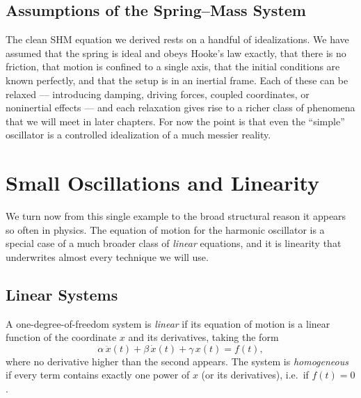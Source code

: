 \subsection{Assumptions of the Spring--Mass System}

The clean SHM equation we derived rests on a handful of idealizations. We have assumed that the spring is ideal and obeys Hooke's law exactly, that there is no friction, that motion is confined to a single axis, that the initial conditions are known perfectly, and that the setup is in an inertial frame. Each of these can be relaxed --- introducing damping, driving forces, coupled coordinates, or noninertial effects --- and each relaxation gives rise to a richer class of phenomena that we will meet in later chapters. For now the point is that even the ``simple'' oscillator is a controlled idealization of a much messier reality.

\section{Small Oscillations and Linearity}

We turn now from this single example to the broad structural reason it appears so often in physics. The equation of motion for the harmonic oscillator is a special case of a much broader class of \emph{linear} equations, and it is linearity that underwrites almost every technique we will use.

\subsection{Linear Systems}

\begin{definition}
A one-degree-of-freedom system is \emph{linear} if its equation of motion is a linear function of the coordinate $x$ and its derivatives, taking the form
\begin{equation}
    \alpha\,\ddot{x}(t) + \beta\,\dot{x}(t) + \gamma\,x(t) = f(t), \label{eq:linear-ode}
\end{equation}
where no derivative higher than the second appears. The system is \emph{homogeneous} if every term contains exactly one power of $x$ (or its derivatives), i.e.\ if $f(t) = 0$.
\end{definition}

